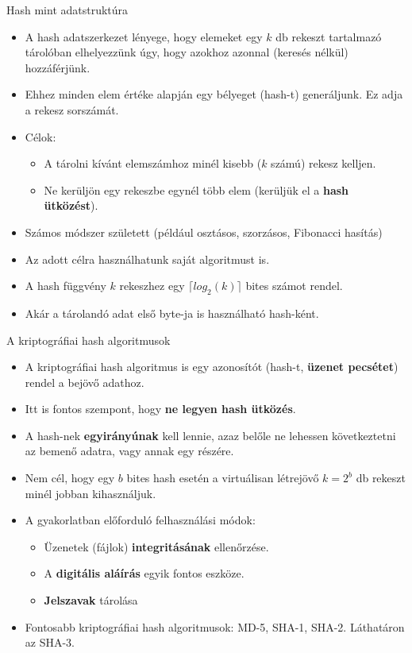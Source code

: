 \documentclass[12 pt]{beamer}
\begin{document}
\begin{frame}{Hash mint adatstruktúra}
    \begin{itemize}
      \item{A hash adatszerkezet lényege, hogy elemeket egy $k$ db rekeszt tartalmazó tárolóban elhelyezzünk úgy, hogy azokhoz azonnal (keresés nélkül) hozzáférjünk.}
      \item{Ehhez minden elem értéke alapján egy bélyeget (hash-t) generáljunk. Ez adja a rekesz sorszámát.}
      \item{Célok:}
        \begin{itemize}
          \item{A tárolni kívánt elemszámhoz minél kisebb ($k$ számú) rekesz kelljen.}
          \item{Ne kerüljön egy rekeszbe egynél több elem (kerüljük el a \textbf{hash ütközést}).}
        \end{itemize}
      \item{Számos módszer született (például osztásos, szorzásos, Fibonacci hasítás)}
      \item{Az adott célra használhatunk saját algoritmust is.}
      \item{A hash függvény $k$ rekeszhez egy $\lceil log_{2}(k) \rceil$ bites számot rendel.}
      \item{Akár a tárolandó adat első byte-ja is használható hash-ként.}
    \end{itemize}
\end{frame}

\begin{frame}{A kriptográfiai hash algoritmusok}
  \begin{itemize}
    \item{A kriptográfiai hash algoritmus is egy azonosítót (hash-t, \textbf{üzenet pecsétet}) rendel a bejövő adathoz.}
    \item{Itt is fontos szempont, hogy \textbf{ne legyen hash ütközés}.}
    \item{A hash-nek \textbf{egyirányúnak} kell lennie, azaz belőle ne lehessen következtetni az bemenő adatra, vagy annak egy részére.}
    \item{Nem cél, hogy egy $b$ bites hash esetén a virtuálisan létrejövő $k = 2^b$ db rekeszt minél jobban kihasználjuk.}
    \item{A gyakorlatban előforduló felhasználási módok:}
      \begin{itemize}
        \item{Üzenetek (fájlok) \textbf{integritásának} ellenőrzése.}
        \item{A \textbf{digitális aláírás} egyik fontos eszköze.}
        \item{\textbf{Jelszavak} tárolása}
      \end{itemize}
    \item{Fontosabb kriptográfiai hash algoritmusok: MD-5, SHA-1, SHA-2. Láthatáron az SHA-3.}
  \end{itemize}
\end{frame}
\end{document}
